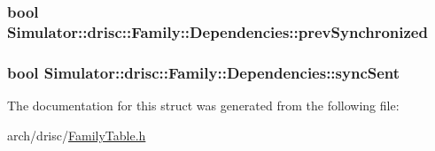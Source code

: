 \hypertarget{struct_simulator_1_1drisc_1_1_family_1_1_dependencies_a1ca68fd8bae8fc61d26e226888d665db}{
\subsubsection[{prev\+Synchronized}]{\setlength{\rightskip}{0pt plus 5cm}bool Simulator\+::drisc\+::\+Family\+::\+Dependencies\+::prev\+Synchronized}}\label{struct_simulator_1_1drisc_1_1_family_1_1_dependencies_a1ca68fd8bae8fc61d26e226888d665db}
\hypertarget{struct_simulator_1_1drisc_1_1_family_1_1_dependencies_a95a29dc9050a007ff66a5af00246ee0c}{
\subsubsection[{sync\+Sent}]{\setlength{\rightskip}{0pt plus 5cm}bool Simulator\+::drisc\+::\+Family\+::\+Dependencies\+::sync\+Sent}}\label{struct_simulator_1_1drisc_1_1_family_1_1_dependencies_a95a29dc9050a007ff66a5af00246ee0c}


The documentation for this struct was generated from the following file\+:\begin{DoxyCompactItemize}
\item 
arch/drisc/\hyperlink{_family_table_8h}{Family\+Table.\+h}\end{DoxyCompactItemize}
